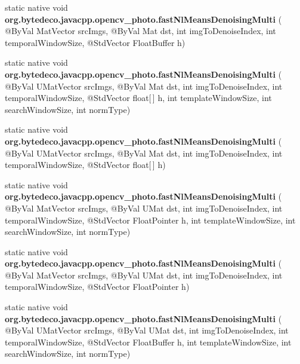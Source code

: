 \begin{DoxyCompactItemize}
\item 
\mbox{\label{group__photo__denoise_gaeb59de00d3350999662c9ac188d0b159}} 
static native void {\bfseries org.\+bytedeco.\+javacpp.\+opencv\+\_\+photo.\+fast\+Nl\+Means\+Denoising\+Multi} ( @By\+Val Mat\+Vector src\+Imgs, @By\+Val Mat dst, int img\+To\+Denoise\+Index, int temporal\+Window\+Size, @Std\+Vector Float\+Buffer h)
\item 
\mbox{\label{group__photo__denoise_gada7d04c233ea1634d9d9d2b9cc42ae2f}} 
static native void {\bfseries org.\+bytedeco.\+javacpp.\+opencv\+\_\+photo.\+fast\+Nl\+Means\+Denoising\+Multi} ( @By\+Val U\+Mat\+Vector src\+Imgs, @By\+Val Mat dst, int img\+To\+Denoise\+Index, int temporal\+Window\+Size, @Std\+Vector float\mbox{[}$\,$\mbox{]} h, int template\+Window\+Size, int search\+Window\+Size, int norm\+Type)
\item 
\mbox{\label{group__photo__denoise_ga1c3ea41895a76af865b5775858540bf1}} 
static native void {\bfseries org.\+bytedeco.\+javacpp.\+opencv\+\_\+photo.\+fast\+Nl\+Means\+Denoising\+Multi} ( @By\+Val U\+Mat\+Vector src\+Imgs, @By\+Val Mat dst, int img\+To\+Denoise\+Index, int temporal\+Window\+Size, @Std\+Vector float\mbox{[}$\,$\mbox{]} h)
\item 
\mbox{\label{group__photo__denoise_ga3b0037911771a51506f88a50b5c50424}} 
static native void {\bfseries org.\+bytedeco.\+javacpp.\+opencv\+\_\+photo.\+fast\+Nl\+Means\+Denoising\+Multi} ( @By\+Val Mat\+Vector src\+Imgs, @By\+Val U\+Mat dst, int img\+To\+Denoise\+Index, int temporal\+Window\+Size, @Std\+Vector Float\+Pointer h, int template\+Window\+Size, int search\+Window\+Size, int norm\+Type)
\item 
\mbox{\label{group__photo__denoise_ga94759e70026f47711045ab7f8d22978e}} 
static native void {\bfseries org.\+bytedeco.\+javacpp.\+opencv\+\_\+photo.\+fast\+Nl\+Means\+Denoising\+Multi} ( @By\+Val Mat\+Vector src\+Imgs, @By\+Val U\+Mat dst, int img\+To\+Denoise\+Index, int temporal\+Window\+Size, @Std\+Vector Float\+Pointer h)
\item 
\mbox{\label{group__photo__denoise_gac03b4e557de380eccf1f6a23436d8154}} 
static native void {\bfseries org.\+bytedeco.\+javacpp.\+opencv\+\_\+photo.\+fast\+Nl\+Means\+Denoising\+Multi} ( @By\+Val U\+Mat\+Vector src\+Imgs, @By\+Val U\+Mat dst, int img\+To\+Denoise\+Index, int temporal\+Window\+Size, @Std\+Vector Float\+Buffer h, int template\+Window\+Size, int search\+Window\+Size, int norm\+Type)

\end{DoxyCompactItemize}
